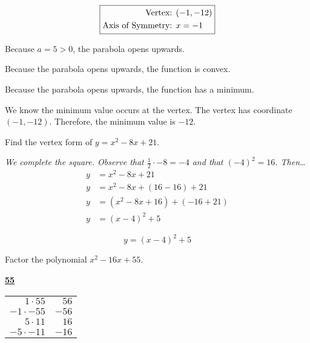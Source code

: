 \documentclass[12pt,letterpaper]{exam}
\begin{document}
\begin{questions}
\begin{enumerate}[(a)]
{	\[
	\boxed{%
	\begin{aligned}
	\text{Vertex: }& (-1, -12) \\
	\text{Axis of Symmetry: }& x= -1
	\end{aligned}
	}
	\] \pspace

\item Because $a= 5 > 0$, the parabola opens upwards. \pspace

\item Because the parabola opens upwards, the function is convex. \pspace

\item Because the parabola opens upwards, the function has a minimum. \pspace

\item We know the minimum value occurs at the vertex. The vertex has coordinate $(-1, -12)$. Therefore, the minimum value is $-12$. 
}
\end{enumerate}





\newpage
\question[5] Find the vertex form of $y= x^2 - 8x + 21$. \pspace

{\noindent\itshape We complete the square. Observe that $\frac{1}{2} \cdot -8= -4$ and that $(-4)^2= 16$. Then\dots}
	\[
	\begin{aligned}
	y&= x^2 - 8x + 21 \\[0.3cm]
	y&= x^2 - 8x + (16 - 16) + 21 \\[0.3cm]
	y&= (x^2 - 8x + 16) + (-16 + 21) \\[0.3cm]
	y&= (x - 4)^2 + 5
	\end{aligned}
	\] \pspace
	
	\[
	\boxed{y= (x - 4)^2 + 5}
	\]





\newpage
\question[5] Factor the polynomial $x^2 - 16x + 55$. \pspace

	\begin{table}[!ht]
	\centering
	\underline{\bfseries 55} \pvspace{0.2cm}
	\begin{tabular}{rr}
	$1 \cdot 55$ & $56$ \\
	$-1 \cdot -55$ & $-56$ \\
	$5 \cdot 11$ & $16$ \\ \hline
	\multicolumn{1}{|r}{$-5 \cdot -11$} & \multicolumn{1}{r|}{$-16$} \\ \hline
	\end{tabular}
	\end{table}


\end{questions}
\end{document}
